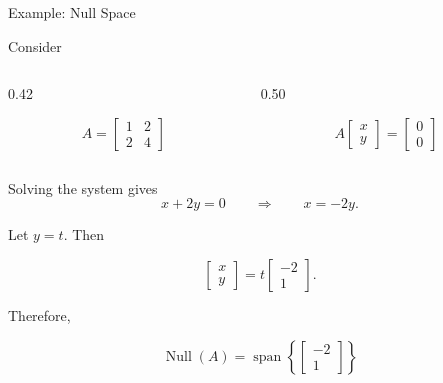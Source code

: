 
\begin{frame}{Example: Null Space}

Consider
\vspace{-1.5cm}
\begin{columns}[c,totalwidth=\textwidth]

\begin{column}{0.42\textwidth}

\begin{center}

\[
A=
\begin{bmatrix}
1&2\\
2&4
\end{bmatrix}
\]

\end{center}

\end{column}

\begin{column}{0.50\textwidth}

\begin{center}

\[
A
\begin{bmatrix}
x\\y
\end{bmatrix}
=
\begin{bmatrix}
0\\0
\end{bmatrix}
\]

\end{center}

\end{column}

\end{columns}

\vspace{0.2cm}

Solving the system gives
\vspace{-0.1cm}
\[
x+2y=0
\qquad\Longrightarrow\qquad
x=-2y.
\]

Let $y=t$. Then

\[
\begin{bmatrix}
x\\y
\end{bmatrix}
=
t
\begin{bmatrix}
-2\\1
\end{bmatrix}.
\]

Therefore,

\[
\boxed{
\operatorname{Null}(A)
=
\operatorname{span}
\left\{
\begin{bmatrix}
-2\\1
\end{bmatrix}
\right\}
}
\]

\end{frame}


